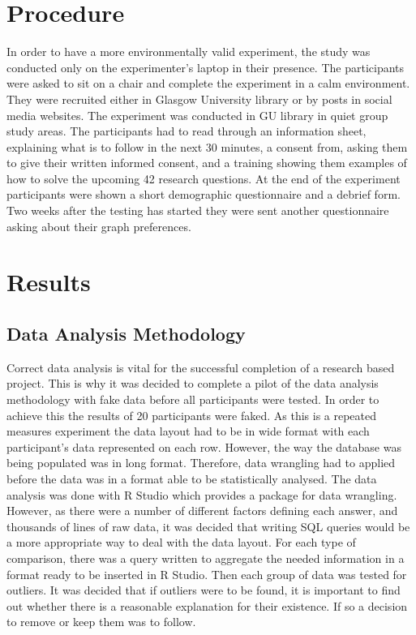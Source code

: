 \documentclass{l4proj}
\begin{document}
\section{Procedure}

In order to have a more environmentally valid experiment, the study was conducted only on the experimenter's laptop in their presence. The participants were asked to sit on a chair and complete the experiment in a calm environment. They were recruited either in Glasgow University library or by posts in social media websites. The experiment was conducted in GU library in quiet group study areas. The participants had to read through an information sheet, explaining what is to follow in the next 30 minutes, a consent from, asking them to give their written informed consent, and a training showing them examples of how to solve the upcoming 42 research questions. At the end of the experiment participants were shown a short demographic questionnaire and a debrief form. Two weeks after the testing has started they were sent another questionnaire asking about their graph preferences.


\section{Results}

\subsection{Data Analysis Methodology}

Correct data analysis is vital for the successful completion of a research based project. This is why it was decided to complete a pilot of the data analysis methodology with fake data before all participants were tested. In order to achieve this the results of 20 participants were faked. As this is a repeated measures experiment the data layout had to be in wide format with each participant's data represented on each row. However, the way the database was being populated was in long format. Therefore, data wrangling had to applied before the data was in a format able to be statistically analysed. The data analysis was done with R Studio which provides a package for data wrangling. However, as there were a number of different factors defining each answer, and thousands of lines of raw data, it was decided that writing SQL queries would be a more appropriate way to deal with the data layout. For each type of comparison, there was a query written to aggregate the needed information in a format ready to be inserted in R Studio. Then each group of data was tested for outliers. It was decided that if outliers were to be found, it is important to find out whether there is a reasonable explanation for their existence. If so a decision to remove or keep them was to follow. 
\end{document}

